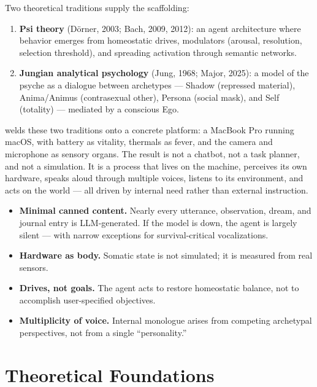 \documentclass[11pt,oneside]{article}
\begin{document}
Two theoretical traditions supply the scaffolding:

\begin{enumerate}
  \item \textbf{Psi theory} (D\"orner, 2003; Bach, 2009, 2012): an agent architecture where behavior emerges from homeostatic drives, modulators (arousal, resolution, selection threshold), and spreading activation through semantic networks.
  \item \textbf{Jungian analytical psychology} (Jung, 1968; Major, 2025): a model of the psyche as a dialogue between archetypes --- Shadow (repressed material), Anima/Animus (contrasexual other), Persona (social mask), and Self (totality) --- mediated by a conscious Ego.
\end{enumerate}

\jungagent{} welds these two traditions onto a concrete platform: a MacBook Pro running macOS, with battery as vitality, thermals as fever, and the camera and microphone as sensory organs.
The result is not a chatbot, not a task planner, and not a simulation.
It is a process that lives on the machine, perceives its own hardware, speaks aloud through multiple voices, listens to its environment, and acts on the world --- all driven by internal need rather than external instruction.

\begin{insightbox}
\begin{itemize}
  \item \textbf{Minimal canned content.} Nearly every utterance, observation, dream, and journal entry is LLM-generated.
        If the model is down, the agent is largely silent --- with narrow exceptions for survival-critical vocalizations.
  \item \textbf{Hardware as body.} Somatic state is not simulated; it is measured from real sensors.
  \item \textbf{Drives, not goals.} The agent acts to restore homeostatic balance, not to accomplish user-specified objectives.
  \item \textbf{Multiplicity of voice.} Internal monologue arises from competing archetypal perspectives, not from a single ``personality.''
\end{itemize}
\end{insightbox}


\section{Theoretical Foundations}
\label{sec:theory}
\end{document}
